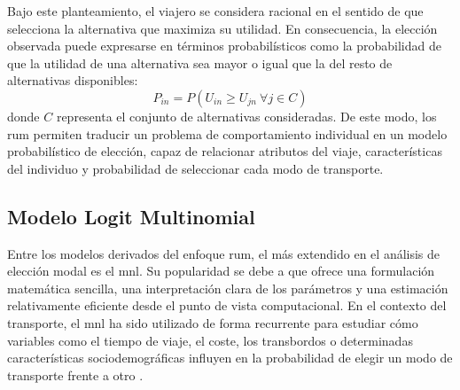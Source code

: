 Bajo este planteamiento, el viajero se considera racional en el sentido de que selecciona la alternativa que maximiza su utilidad. En consecuencia, la elección observada puede expresarse en términos probabilísticos como la probabilidad de que la utilidad de una alternativa sea mayor o igual que la del resto de alternativas disponibles:
\begin{equation}
P_{in} = P(U_{in} \geq U_{jn}\ \forall j \in C)
\end{equation}
donde $C$ representa el conjunto de alternativas consideradas. De este modo, los \gls{rum} permiten traducir un problema de comportamiento individual en un modelo probabilístico de elección, capaz de relacionar atributos del viaje, características del individuo y probabilidad de seleccionar cada modo de transporte.

\subsection{Modelo Logit Multinomial}

Entre los modelos derivados del enfoque \gls{rum}, el más extendido en el análisis de elección modal es el \gls{mnl}. Su popularidad se debe a que ofrece una formulación matemática sencilla, una interpretación clara de los parámetros y una estimación relativamente eficiente desde el punto de vista computacional. En el contexto del transporte, el \gls{mnl} ha sido utilizado de forma recurrente para estudiar cómo variables como el tiempo de viaje, el coste, los transbordos o determinadas características sociodemográficas influyen en la probabilidad de elegir un modo de transporte frente a otro \cite{McFadden1974}.\newline

